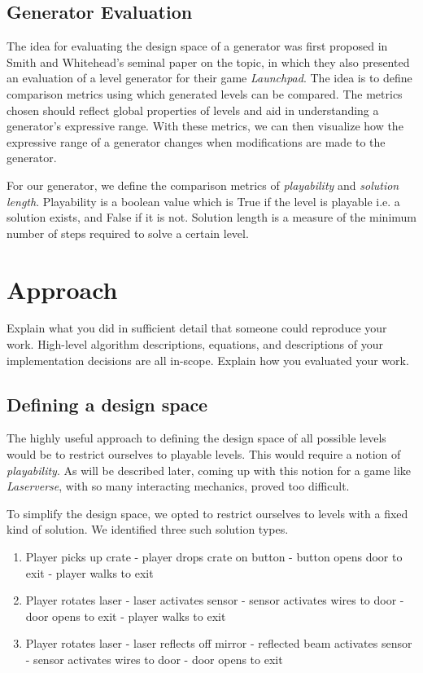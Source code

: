 \documentclass[letterpaper]{article}
\begin{document}
\subsection{Generator Evaluation}
The idea for evaluating the design space of a generator was first proposed in Smith and Whitehead's
\cite{Smith:2010:AER:1814256.1814260} seminal paper on the topic, in which they also presented an evaluation of a level
generator for their game \textit{Launchpad}. The idea is to define comparison metrics using which generated levels can
be compared. The metrics chosen should reflect global properties of levels and aid in understanding a generator's
expressive range. With these metrics, we can then visualize how the expressive range of a generator changes when
modifications are made to the generator.

For our generator, we define the comparison metrics of \textit{playability} and \textit{solution length}. Playability is
a boolean value which is True if the level is playable i.e. a solution exists, and False if it is not. Solution length
is a measure of the minimum number of steps required to solve a certain level.

\section{Approach}
Explain what you did in sufficient detail that someone could reproduce your work. High-level algorithm descriptions,
equations, and descriptions of your implementation decisions are all in-scope. Explain how you evaluated your work.

\subsection{Defining a design space}
The highly useful approach to defining the design space of all possible levels would be to restrict ourselves to
playable levels. This would require a notion of \textit{playability}. As will be described later, coming up with this
notion for a game like \textit{Laserverse}, with so many interacting mechanics, proved too difficult.

To simplify the design space, we opted to restrict ourselves to levels with a fixed kind of solution. We identified
three such solution types.
\begin{enumerate}
    \item Player picks up crate - player drops crate on button - button opens door to exit - player walks to exit
    \item Player rotates laser - laser activates sensor - sensor activates wires to door - door opens to exit - player
          walks to exit
    \item Player rotates laser - laser reflects off mirror - reflected beam activates sensor - sensor activates wires to
          door - door opens to exit
\end{enumerate}
\end{document}

